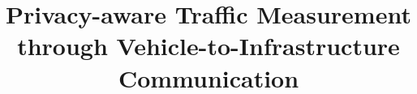 \documentclass[conference]{IEEEtran}
\begin{document}
 

 
 
\title{Privacy-aware Traffic Measurement through Vehicle-to-Infrastructure Communication}


\maketitle
\vspace{-1in}
\begin{abstract}
	
\end{abstract}

 


 
 


 


 

 

 

 

 



 
\end{document}
